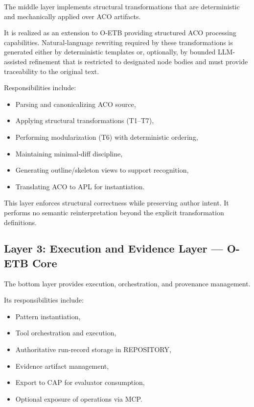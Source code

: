 \documentclass[12pt,twoside,a4paper]{article}
\begin{document}
The middle layer implements structural transformations that are deterministic and mechanically applied over ACO artifacts.

It is realized as an extension to O-ETB providing structured ACO processing capabilities.
Natural-language rewriting required by these transformations is generated either by deterministic templates or, optionally, by bounded LLM-assisted refinement that is restricted to designated node bodies and must provide traceability to the original text.

Responsibilities include:

\begin{itemize}
  \item Parsing and canonicalizing ACO source,
  \item Applying structural transformations (T1--T7),
  \item Performing modularization (T6) with deterministic ordering,
  \item Maintaining minimal-diff discipline,
  \item Generating outline/skeleton views to support recognition,
  \item Translating ACO to APL for instantiation.
\end{itemize}

This layer enforces structural correctness while preserving author intent. It performs no semantic reinterpretation beyond the explicit transformation definitions.

\subsection{Layer 3: Execution and Evidence Layer --- O-ETB Core}

The bottom layer provides execution, orchestration, and provenance management.

Its responsibilities include:

\begin{itemize}
  \item Pattern instantiation,
  \item Tool orchestration and execution,
  \item Authoritative run-record storage in REPOSITORY,
  \item Evidence artifact management,
  \item Export to CAP for evaluator consumption,
  \item Optional exposure of operations via MCP.
\end{itemize}
\end{document}
